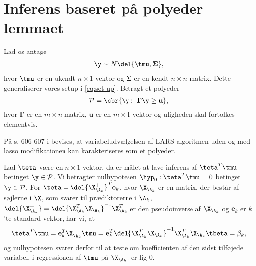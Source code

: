 \section{Inferens baseret på polyeder lemmaet} \label{subsec:teste_polyhedron}
Lad os antage
\begin{align*}
\y \sim N \del{\tmu,  \boldsymbol{\Sigma}},
\end{align*}
hvor \(\tmu\) er en ukendt \(n \times 1\) vektor og \(\boldsymbol{\Sigma}\) er en kendt \(n \times n\) matrix.
Dette generaliserer vores setup i \eqref{eq:set-up}.
Betragt et polyeder
\begin{align*}
\mathcal{P} = \cbr{\y : \ \boldsymbol{\Gamma} \y \geq \mathbf{u}},
\end{align*}
hvor \(\boldsymbol{\Gamma}\) er en \(m \times n\) matrix, \(\mathbf{u}\) er en \(m \times 1\) vektor og uligheden skal fortolkes elementvis.

På s. 606-607 i \citep{post_inference} bevises, at variabeludvælgelsen af LARS algoritmen uden og med lasso modifikationen kan karakteriseres som et polyeder.


Lad \(\teta\) være en \(n \times 1\) vektor, da er målet at lave inferens af  \(\teta^T \tmu\) betinget \(\y \in \mathcal{P}\).
Vi betragter nulhypotesen \(\hyp_0 : \teta^T \tmu = 0\) betinget \(\y \in \mathcal{P}\).
For \(\teta = \del{\X_{\A_k}^+}^T \mathbf{e}_k\), hvor \(\X_{\A_k}\) er en matrix, der består af søjlerne i \(\X\), som svarer til prædiktorerne i \(\A_k\), \( \del{\X_{\A_k}^+} = \del{\X_{\A_k}^T \X_{\A_k}}^{-1} \X_{\A_k}^T\) er den pseudoinverse af \(\X_{\A_k}\) og \(\mathbf{e}_k\) er \(k\)'te standard vektor, har vi, at
\begin{align*}
\teta^T \tmu = \mathbf{e}_k^T \X_{\A_k}^+ \tmu =  \mathbf{e}_k^T \del{\X_{\A_k}^T \X_{\A_k}}^{-1} \X_{\A_k}^T \X_{\A_k} \tbeta = \beta_k,
\end{align*}
og nulhypotesen svarer derfor til at teste om koefficienten af den sidst tilføjede variabel, i regressionen af \(\tmu\) på \(\X_{\A_k}\), er lig 0.


